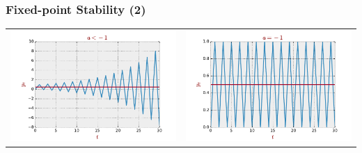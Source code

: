\documentclass[10pt,usenames,dvipsnames]{beamer}
\theoremstyle{definition}
\begin{document}
\begin{frame}[fragile]
\frametitle{Fixed-point Stability (2)}
\begin{center}
	\begin{tabular}{cc}
		\includegraphics[scale=0.3]{./figs/fig1} & \includegraphics[scale=0.3]{./figs/fig2}\\

\end{tabular}
\end{center}
\end{frame}
\end{document}
